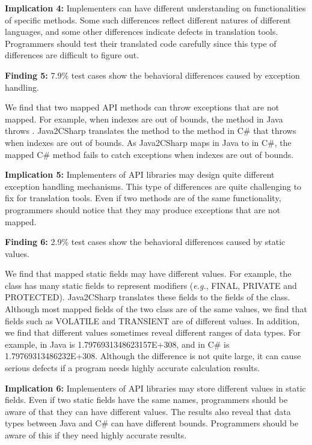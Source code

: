 \textbf{Implication 4:} Implementers can have different understanding on functionalities of specific methods. Some such differences reflect different natures of different languages, and some other differences indicate  defects in translation tools. Programmers should test their translated code carefully since this type of differences are difficult to figure out.

\textbf{Finding 5:} 7.9\% test cases show the behavioral differences caused by exception handling.

We find that two mapped API methods can throw exceptions that are not mapped. For example, when indexes are out of bounds, the  method in Java throws . Java2CSharp translates the method to the  method in C\# that throws  when indexes are out of bounds. As Java2CSharp maps  in Java to  in C\#, the mapped C\# method fails to catch exceptions when indexes are out of bounds.

\textbf{Implication 5:} Implementers of API libraries may design quite different exception handling mechanisms. This type of differences are quite challenging to fix for translation tools. Even if two methods are of the same functionality, programmers should notice that they may produce exceptions that are not mapped.

\textbf{Finding 6:} 2.9\% test cases show the behavioral differences caused by static values.


We find that mapped static fields may have different values. For example, the  class has many static fields to represent modifiers (\emph{e.g.}, FINAL, PRIVATE and PROTECTED). Java2CSharp translates these fields to the fields of the  class. Although most mapped fields of the two class are of the same values, we find that fields such as VOLATILE and TRANSIENT are of different values. In addition, we find that different values sometimes reveal different ranges of data types. For example,  in Java is 1.7976931348623157E+308, and  in C\# is 1.79769313486232E+308.  Although the difference is not quite large, it can cause serious defects if a program needs highly accurate calculation results.

\textbf{Implication 6:} Implementers of API libraries may store different values in static fields. Even if two static fields have the same names, programmers should be aware of that they can have different values. The results also reveal that data types between Java and C\# can have different bounds. Programmers should be aware of this if they need highly accurate results.

